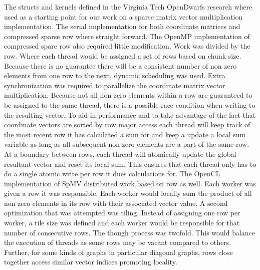 \documentclass[conference]{IEEEtran}
\begin{document}
The structs and kernels defined in the Virginia Tech OpenDwarfs research where used as a starting point for our work 
on a sparse matrix vector multiplication implementation\cite{krommydas2016opendwarfs}.
The serial implementation for both coordinate matrices and compressed sparse row where straight forward. The OpenMP 
implementation of compressed spare row also required little modification. Work was divided by the row. Where each 
thread would be assigned a set of rows based on chunk size. Because there is no guarantee there will be a consistent 
number of non zero elements from one row to the next, dynamic scheduling was used. Extra synchronization was required to 
parallelize the coordinate matrix vector multiplication. Because not all non zero elements within a row are guaranteed to 
be assigned to the same thread, there is a possible race condition when writing to the resulting vector. To aid in performance 
and to take advantage of the fact that coordinate vectors are sorted by row major access each thread will keep track of the most recent 
row it has calculated a sum for and keep a update a local sum variable as long as all subsequent non zero elements are a part 
of the same row. At a boundary between rows, each thread will atomically update the global resultant vector and reset its local sum. 
This ensures that each thread only has to do a single atomic write per row it dues calculations for. The OpenCL implementation of 
SpMV distributed work based on row as well. Each worker was given a row it was responsible. Each worker would locally sum the 
product of all non zero elements in its row with their associated vector value. A second optimization that was attempted was 
tiling. Instead of assigning one row per worker, a tile size was defined and each worker would be responsible for that number 
of consecutive rows. The though process was twofold. This would balance the execution of threads as some rows may be vacant compared 
to others. Further, for some kinds of graphs in particular diagonal graphs, rows close together access similar vector indices promoting locality.
\end{document}
